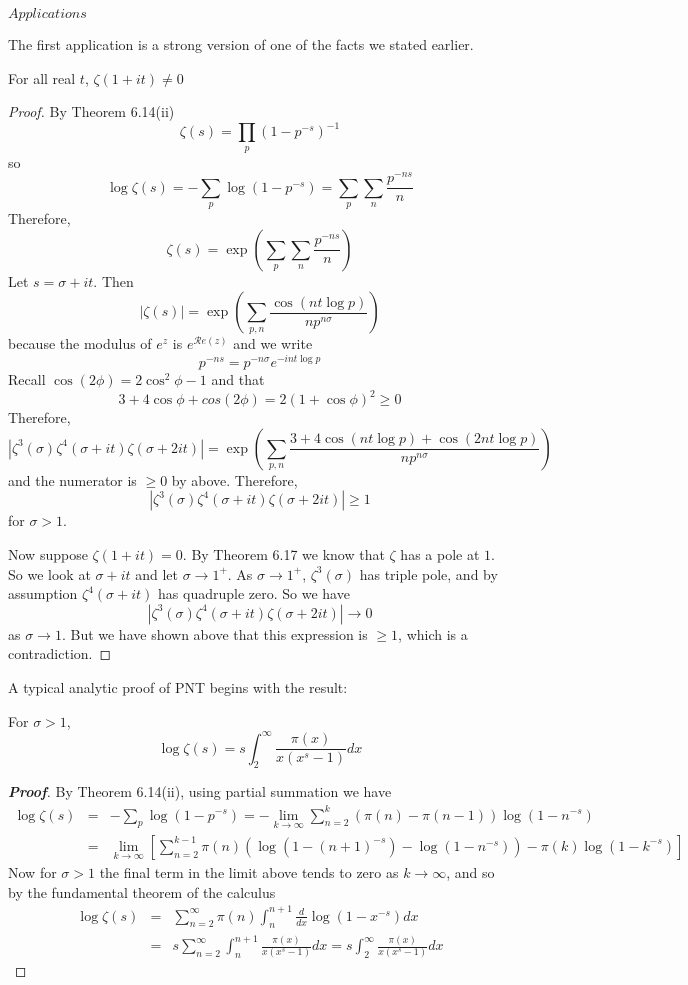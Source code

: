 \begin{flushleft}
$Applications$
\end{flushleft}
The first application is a strong version of one of the facts we stated earlier.
\begin{theorem} For all real $t$, $\zeta(1+it) \neq 0$
\end{theorem}
\begin{proof}
By Theorem 6.14(ii)
$$\zeta(s)=\prod_p (1-p^{-s})^{-1}$$
so
$$\log{\zeta(s)}=-\sum_p \log{(1-p^{-s})}=\sum_p \sum_n \frac{p^{-ns}}{n}$$
Therefore,
$$\zeta(s)=\exp{\left(\sum_p \sum_n \frac{p^{-ns}}{n}\right)}$$
Let $s=\sigma+it$. Then
$$\left|\zeta(s)\right|=\exp{\left(\sum_{p,n}\frac{\cos{(nt\log{p})}}{np^{n\sigma}}\right)}$$
because the modulus of $e^{z}$ is $e^{\mathcal{R}e(z)}$ and we write
$$p^{-ns}=p^{-n\sigma}e^{-int\log{p}}$$
Recall $\cos{(2\phi)}=2\cos^2{\phi}-1$ and that
$$3+4\cos{\phi}+cos{(2\phi)}=2(1+\cos{\phi})^2 \ge 0$$
Therefore,
$$|\zeta^3(\sigma)\zeta^4(\sigma+it)\zeta(\sigma+2it)|
=\exp{\left(\sum_{p,n}\frac{3+4\cos{(nt\log{p})}+\cos{(2nt\log{p})}}{np^{n\sigma}}\right)}$$
and the numerator is $\ge 0$ by above.
Therefore,
$$|\zeta^3(\sigma)\zeta^4(\sigma+it)\zeta(\sigma+2it)| \ge 1$$
for $\sigma > 1$.

Now suppose $\zeta(1+it)=0$. By Theorem 6.17 we know that $\zeta$ has a pole at $1$. So we look at
$\sigma+it$ and let $\sigma \to 1^+$. As $\sigma \to 1^+$, $\zeta^3(\sigma)$ has triple pole, and
by assumption $\zeta^4(\sigma+it)$ has quadruple zero. So we have
$$|\zeta^3(\sigma)\zeta^4(\sigma+it)\zeta(\sigma+2it)| \to 0$$
as $\sigma \to 1$. But we have shown above that this expression is $\ge 1$, which is a contradiction.
\end{proof}
A typical analytic proof of PNT begins with the result:
\begin{theorem} For $\sigma >1$,
$$\log{\zeta(s)}=s \int_2^\infty \frac{\pi(x)}{x(x^s-1)} dx$$
\end{theorem}
\begin{proof}[\bf Proof] By Theorem 6.14(ii), using partial summation we have
\begin{eqnarray*}
\log{\zeta(s)}&=&-\sum_p \log{(1-p^{-s})}=-\lim_{k \to \infty}\sum_{n=2}^{k}(\pi(n)-\pi(n-1))
\log{(1-n^{-s})}\\
&=&\lim_{k \to \infty}\left[\sum_{n=2}^{k-1}\pi(n)(\log{(1-(n+1)^{-s})}-\log{(1-n^{-s})})-\pi(k)\log{(1-k^{-s})}\right]
\end{eqnarray*}
Now for $\sigma >1$ the final term in
the limit above tends to zero as $k \to \infty$, and so by the
fundamental theorem of the calculus
\begin{eqnarray*}
\log{\zeta(s)}&=&\sum_{n=2}^\infty \pi(n)\int_n^{n+1} \frac{d}{dx}\log{(1-x^{-s})}dx\\
&=&s \sum_{n=2}^\infty \int_n^{n+1} \frac{\pi(x)}{x(x^s-1)}dx=s\int_2^\infty \frac{\pi(x)}{x(x^s-1)}dx
\end{eqnarray*}
\end{proof}
